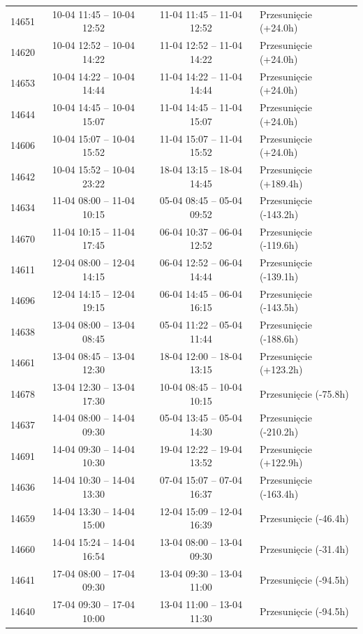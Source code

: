 \begin{table}[htbp]
\begin{tabular}{|r|c|c|l|}
14651 & 10-04 11:45 -- 10-04 12:52 & 11-04 11:45 -- 11-04 12:52 & Przesunięcie (+24.0h) \\ 
14620 & 10-04 12:52 -- 10-04 14:22 & 11-04 12:52 -- 11-04 14:22 & Przesunięcie (+24.0h) \\ 
14653 & 10-04 14:22 -- 10-04 14:44 & 11-04 14:22 -- 11-04 14:44 & Przesunięcie (+24.0h) \\ 
14644 & 10-04 14:45 -- 10-04 15:07 & 11-04 14:45 -- 11-04 15:07 & Przesunięcie (+24.0h) \\ 
14606 & 10-04 15:07 -- 10-04 15:52 & 11-04 15:07 -- 11-04 15:52 & Przesunięcie (+24.0h) \\ 
14642 & 10-04 15:52 -- 10-04 23:22 & 18-04 13:15 -- 18-04 14:45 & Przesunięcie (+189.4h) \\ 
14634 & 11-04 08:00 -- 11-04 10:15 & 05-04 08:45 -- 05-04 09:52 & Przesunięcie (-143.2h) \\ 
14670 & 11-04 10:15 -- 11-04 17:45 & 06-04 10:37 -- 06-04 12:52 & Przesunięcie (-119.6h) \\ 
14611 & 12-04 08:00 -- 12-04 14:15 & 06-04 12:52 -- 06-04 14:44 & Przesunięcie (-139.1h) \\ 
14696 & 12-04 14:15 -- 12-04 19:15 & 06-04 14:45 -- 06-04 16:15 & Przesunięcie (-143.5h) \\ 
14638 & 13-04 08:00 -- 13-04 08:45 & 05-04 11:22 -- 05-04 11:44 & Przesunięcie (-188.6h) \\ 
14661 & 13-04 08:45 -- 13-04 12:30 & 18-04 12:00 -- 18-04 13:15 & Przesunięcie (+123.2h) \\ 
14678 & 13-04 12:30 -- 13-04 17:30 & 10-04 08:45 -- 10-04 10:15 & Przesunięcie (-75.8h) \\ 
14637 & 14-04 08:00 -- 14-04 09:30 & 05-04 13:45 -- 05-04 14:30 & Przesunięcie (-210.2h) \\ 
14691 & 14-04 09:30 -- 14-04 10:30 & 19-04 12:22 -- 19-04 13:52 & Przesunięcie (+122.9h) \\ 
14636 & 14-04 10:30 -- 14-04 13:30 & 07-04 15:07 -- 07-04 16:37 & Przesunięcie (-163.4h) \\ 
14659 & 14-04 13:30 -- 14-04 15:00 & 12-04 15:09 -- 12-04 16:39 & Przesunięcie (-46.4h) \\ 
14660 & 14-04 15:24 -- 14-04 16:54 & 13-04 08:00 -- 13-04 09:30 & Przesunięcie (-31.4h) \\ 
14641 & 17-04 08:00 -- 17-04 09:30 & 13-04 09:30 -- 13-04 11:00 & Przesunięcie (-94.5h) \\ 
14640 & 17-04 09:30 -- 17-04 10:00 & 13-04 11:00 -- 13-04 11:30 & Przesunięcie (-94.5h) \\ 

\end{tabular}
\end{table}
